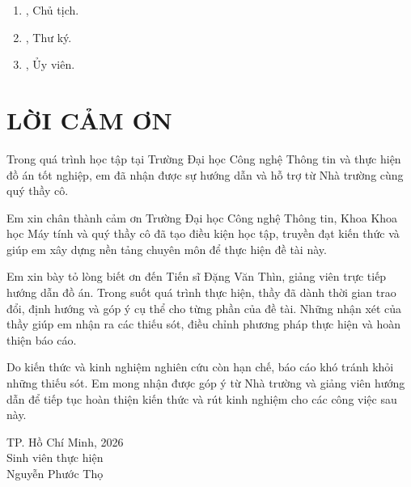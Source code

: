 \documentclass[12pt, a4paper, oneside]{report}
\newcommand{\authorname}{Nguyễn Phước Thọ}
\newcommand{\thesisyear}{2026}
\begin{document}
\vspace{1cm}
\begin{enumerate}
  \item \underline{\hspace{7cm}}, Chủ tịch.
  \item \underline{\hspace{7cm}}, Thư ký.
  \item \underline{\hspace{7cm}}, Ủy viên.
\end{enumerate}

\chapter*{LỜI CẢM ƠN}
\thispagestyle{empty}

Trong quá trình học tập tại Trường Đại học Công nghệ Thông tin và thực hiện đồ án
tốt nghiệp, em đã nhận được sự hướng dẫn và hỗ trợ từ Nhà trường cùng quý thầy cô.

Em xin chân thành cảm ơn Trường Đại học Công nghệ Thông tin, Khoa Khoa học Máy
tính và quý thầy cô đã tạo điều kiện học tập, truyền đạt kiến thức và giúp em xây dựng
nền tảng chuyên môn để thực hiện đề tài này.

Em xin bày tỏ lòng biết ơn đến Tiến sĩ Đặng Văn Thìn, giảng viên trực tiếp hướng dẫn
đồ án. Trong suốt quá trình thực hiện, thầy đã dành thời gian trao đổi, định hướng và
góp ý cụ thể cho từng phần của đề tài. Những nhận xét của thầy giúp em nhận ra các
thiếu sót, điều chỉnh phương pháp thực hiện và hoàn thiện báo cáo.

Do kiến thức và kinh nghiệm nghiên cứu còn hạn chế, báo cáo khó tránh khỏi những
thiếu sót. Em mong nhận được góp ý từ Nhà trường và giảng viên hướng dẫn để tiếp tục
hoàn thiện kiến thức và rút kinh nghiệm cho các công việc sau này.

\vspace{1cm}
\begin{flushright}
TP. Hồ Chí Minh, \thesisyear\\
Sinh viên thực hiện\\[1cm]
\authorname
\end{flushright}

\tableofcontents
\clearpage
\listoffigures
\clearpage
\listoftables
\clearpage
\end{document}
